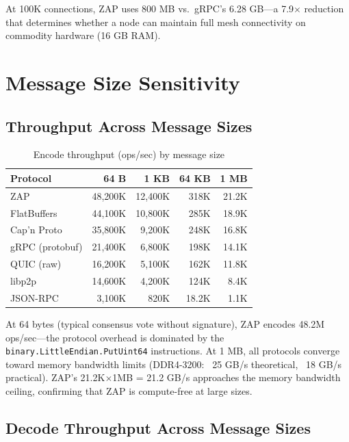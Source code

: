 \documentclass[11pt,letterpaper]{article}
\begin{document}
At 100K connections, ZAP uses 800 MB vs.\ gRPC's 6.28 GB---a 7.9$\times$ reduction that determines whether a node can maintain full mesh connectivity on commodity hardware (16 GB RAM).

\section{Message Size Sensitivity}

\subsection{Throughput Across Message Sizes}

\begin{table}[h]
\centering
\caption{Encode throughput (ops/sec) by message size}
\label{tab:sizes}
\begin{tabular}{lrrrr}
\toprule
\textbf{Protocol} & \textbf{64 B} & \textbf{1 KB} & \textbf{64 KB} & \textbf{1 MB} \\
\midrule
\rowcolor{luxblue!10}
ZAP & 48,200K & 12,400K & 318K & 21.2K \\
FlatBuffers & 44,100K & 10,800K & 285K & 18.9K \\
Cap'n Proto & 35,800K & 9,200K & 248K & 16.8K \\
gRPC (protobuf) & 21,400K & 6,800K & 198K & 14.1K \\
QUIC (raw) & 16,200K & 5,100K & 162K & 11.8K \\
libp2p & 14,600K & 4,200K & 124K & 8.4K \\
JSON-RPC & 3,100K & 820K & 18.2K & 1.1K \\
\bottomrule
\end{tabular}
\end{table}

At 64 bytes (typical consensus vote without signature), ZAP encodes 48.2M ops/sec---the protocol overhead is dominated by the \texttt{binary.LittleEndian.PutUint64} instructions. At 1 MB, all protocols converge toward memory bandwidth limits (DDR4-3200: ~25 GB/s theoretical, ~18 GB/s practical). ZAP's 21.2K$\times$1MB = 21.2 GB/s approaches the memory bandwidth ceiling, confirming that ZAP is compute-free at large sizes.

\subsection{Decode Throughput Across Message Sizes}
\end{document}
